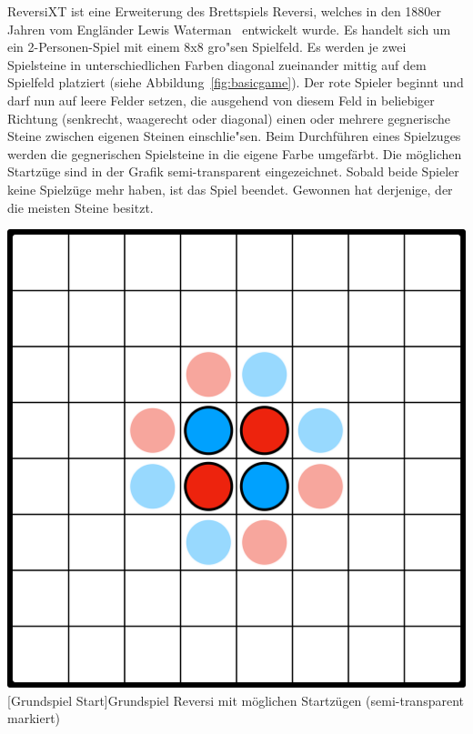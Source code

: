 ReversiXT ist eine Erweiterung des Brettspiels Reversi, welches in den 1880er Jahren vom Engl\"ander Lewis Waterman~\cite{ReversiInventor} entwickelt wurde.
Es handelt sich um ein 2-Personen-Spiel mit einem 8x8 gro"sen Spielfeld.
Es werden je zwei Spielsteine in unterschiedlichen Farben diagonal zueinander mittig auf dem Spielfeld platziert (siehe Abbildung~\ref{fig:basicgame}).
Der rote Spieler beginnt und darf nun auf leere Felder setzen, die ausgehend von diesem Feld in beliebiger Richtung (senkrecht, waagerecht oder diagonal) einen oder mehrere gegnerische Steine zwischen eigenen Steinen einschlie"sen.
Beim Durchf\"uhren eines Spielzuges werden die gegnerischen Spielsteine in die eigene Farbe umgef\"arbt.
Die m\"oglichen Startz\"uge sind in der Grafik semi-transparent eingezeichnet.
Sobald beide Spieler keine Spielz\"uge mehr haben, ist das Spiel beendet.
Gewonnen hat derjenige, der die meisten Steine besitzt.

\vspace{1em}
\begin{minipage}{\linewidth}
	\centering
	\includegraphics[width=0.5\linewidth]{pics/basicgame-start}
	[Grundspiel Start]{Grundspiel Reversi mit m\"oglichen Startz\"ugen (semi-transparent markiert)}
	\label{fig:basicgame}
\end{minipage}

